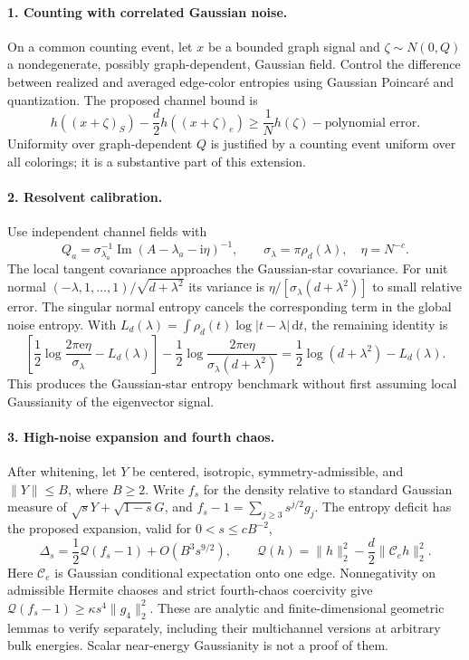 \documentclass[11pt]{article}
\numberwithin{equation}{section}
\theoremstyle{definition}
\theoremstyle{remark}
\newcommand{\ee}{\mathrm e}
\newcommand{\ii}{\mathrm i}
\newcommand{\dd}{\,\mathrm d}
\begin{document}
\paragraph{1. Counting with correlated Gaussian noise.}
On a common counting event, let $x$ be a bounded graph signal and
$\zeta\sim N(0,Q)$ a nondegenerate, possibly graph-dependent, Gaussian
field. Control the difference between realized and averaged edge-color
entropies using Gaussian Poincar\'e and quantization. The proposed
channel bound is
\[
 h((x+\zeta)_S)-\frac d2h((x+\zeta)_e)
 \geq\frac1Nh(\zeta)-\text{polynomial error}.
\]
Uniformity over graph-dependent $Q$ is justified by a counting event
uniform over all colorings; it is a substantive part of this extension.

\paragraph{2. Resolvent calibration.}
Use independent channel fields with
\[
 Q_a=\sigma_{\lambda_a}^{-1}
       \operatorname{Im}(A-\lambda_a-\ii\eta)^{-1},\qquad
 \sigma_\lambda=\pi\rho_d(\lambda),\quad\eta=N^{-c}.
\]
The local tangent covariance approaches the Gaussian-star covariance.
For unit normal $(-\lambda,1,\ldots,1)/\sqrt{d+\lambda^2}$ its variance
is $\eta/[\sigma_\lambda(d+\lambda^2)]$ to small relative error.
The singular normal entropy cancels the corresponding term in the
global noise entropy. With
$L_d(\lambda)=\int\rho_d(t)\log|t-\lambda|\dd t$, the remaining identity is
\[
 \left[\frac12\log\frac{2\pi\ee\eta}{\sigma_\lambda}-L_d(\lambda)\right]
 -\frac12\log\frac{2\pi\ee\eta}{\sigma_\lambda(d+\lambda^2)}
 =\frac12\log(d+\lambda^2)-L_d(\lambda).
\]
This produces the Gaussian-star entropy benchmark without first
assuming local Gaussianity of the eigenvector signal.

\paragraph{3. High-noise expansion and fourth chaos.}
After whitening, let $Y$ be centered, isotropic, symmetry-admissible,
and $\|Y\|\leq B$, where $B\geq2$. Write $f_s$ for the density relative to standard
Gaussian measure of $\sqrt sY+\sqrt{1-s}G$, and
$f_s-1=\sum_{j\geq3}s^{j/2}g_j$. The entropy deficit has the proposed
expansion, valid for $0<s\leq cB^{-2}$,
\[
 \Delta_s=\frac12\mathcal Q(f_s-1)+O(B^3s^{9/2}),\qquad
 \mathcal Q(h)=\|h\|_2^2-\frac d2\|\mathcal C_e h\|_2^2.
\]
Here $\mathcal C_e$ is Gaussian conditional expectation onto one edge.
Nonnegativity on admissible Hermite chaoses and strict fourth-chaos
coercivity give
$\mathcal Q(f_s-1)\geq\kappa s^4\|g_4\|_2^2$.
These are analytic and finite-dimensional geometric lemmas to verify
separately, including their multichannel versions at arbitrary bulk
energies. Scalar near-energy Gaussianity is not a proof of them.
\end{document}
